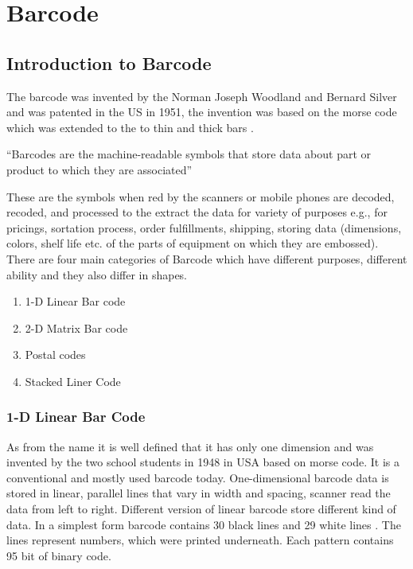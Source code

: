 %
%
%

\chapter{Barcode}

\section{Introduction to Barcode}

The barcode was invented by the Norman Joseph Woodland and Bernard Silver and was patented in the US in 1951, the invention was based on the morse code which was extended to the to thin and thick bars \cite{Woodland:1952}.

\medskip

``Barcodes are the machine-readable symbols that store data about part or product to which they are associated''

\medskip

These are the symbols when red by the scanners or mobile phones are decoded, recoded, and processed to the extract the data for variety of purposes e.g., for pricings, sortation process, order fulfillments, shipping, storing data (dimensions, colors, shelf life etc. of the parts of equipment on which they are embossed). 
There are four main categories of Barcode which have different purposes, different ability and they also differ in shapes.

\begin{enumerate} 
	\item 1-D Linear Bar code
	\item 2-D Matrix Bar code 
	\item Postal codes
	\item Stacked Liner Code
\end{enumerate}

\subsection{1-D Linear Bar Code}

As from the name it is well defined that it has only one dimension and was invented by the two school students in 1948 in USA based on morse code. It is a conventional and mostly used barcode today. One-dimensional barcode data is stored in linear, parallel lines that vary in width and spacing, scanner read the data from left to right. Different version of linear barcode store different kind of data. In a simplest form barcode contains 30 black lines and 29 white lines . The lines represent numbers, which were printed underneath. Each pattern contains 95 bit of binary code. \cite{Yun:2017}

